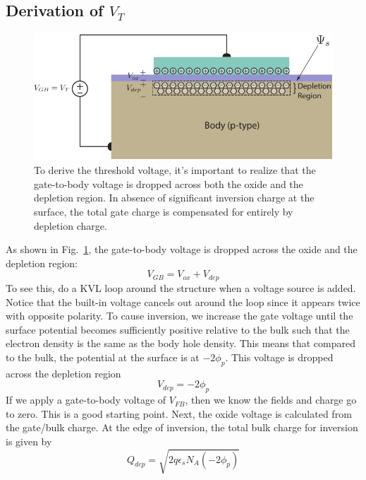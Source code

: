 \subsection{Derivation of \texorpdfstring{$V_T$}{Threshold Voltage}}
\begin{figure}[tbh]
\centering
\includegraphics[width=.75\columnwidth]{mos_cap_threshold}
\caption{To derive the threshold voltage, it's important to realize that the gate-to-body voltage is dropped across both the oxide and the depletion region.  In absence of significant inversion charge at the surface, the total gate charge is compensated for entirely by depletion charge.}
\label{fig:mos_vt_derive}
\end{figure} 
As shown in Fig.~\ref{fig:mos_vt_derive}, the gate-to-body voltage is dropped across the oxide and the depletion region:
    \begin{equation}
        V_{GB} = V_{ox} + V_{dep}
    \end{equation}
To see this, do a KVL loop around the structure when a voltage source is added.   Notice that the built-in voltage cancels out around the loop since it appears twice with opposite polarity.   To cause inversion, we increase the gate voltage until the surface potential becomes sufficiently positive relative to the bulk such that the electron density is the same as the body hole density.  This means that compared to the bulk, the potential at the surface is at $-2\phi_p$.  This voltage is dropped across the depletion region
    \begin{equation}
        V_{dep} = -2 \phi_p
    \end{equation}
If we apply a gate-to-body voltage of $V_{FB}$, then we know the fields and charge go to zero. This is a good starting point.  Next, the oxide voltage is calculated from the gate/bulk charge.  At the edge of inversion, the total bulk charge for inversion is given by 
    \begin{equation}
        Q_{dep} = \sqrt{2 q \epsilon_s N_A (-2 \phi_p) }
    \end{equation}
